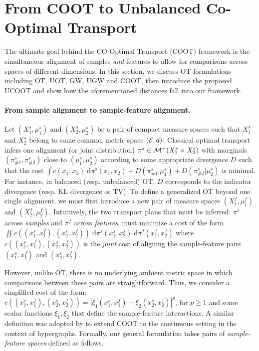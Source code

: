 \section{From COOT to Unbalanced Co-Optimal Transport} \label{sec:ucoot}
The ultimate goal behind the CO-Optimal Transport (COOT)
framework is the simultaneous alignment of samples \emph{and} features to allow for
comparisons across spaces of different dimensions. In this section, we discuss
OT formulations including OT, UOT, GW, UGW and COOT, then introduce the proposed UCOOT
and show how the aforementioned distances fall into our framework.


\paragraph{From sample alignment to sample-feature alignment.}
Let $(X_1^s, \mu_1^s)$ and $(X_2^s, \mu_2^s)$ be a pair of compact measure spaces such that
$X_1^s$ and $X_2^s$ belong to some common metric space $(\mathcal E, d)$.
Classical optimal transport infers one alignment (or joint distribution)
$\pi^s \in \mathcal M^+(X_1^{s} \times X_2^s)$ with marginals $(\pi^{s}_{\#1}, \pi^{s}_{\#2})$
close to $(\mu_1^s, \mu_2^s)$ according to some appropriate divergence $D$ such that
the cost $\int c(x_1, x_2) \; \mathrm d\pi^{s}(x_1, x_2) + D(\pi^{s}_{\#1} | \mu_1^s)
+ D(\pi^{s}_{\#2} | \mu_2^s)$ is minimal. For instance, in balanced (resp. unbalanced) OT,
$D$ corresponds to the indicator divergence (resp. KL divergence or TV).
To define a generalized OT beyond one single alignment, we must first introduce
a new pair of measure spaces $(X_1^{f}, \mu_1^f)$ and $(X_2^{f}, \mu_2^f)$.
Intuitively, the two transport plans that must be inferred: $\pi^s$ across \emph{samples}
and $\pi^f$ across \emph{features}, must minimize a cost of the form
$\iint c((x_1^s, x_1^f), (x_2^s, x_2^f)) \; \mathrm d\pi^s(x_1^s, x_2^s)\; \mathrm d \pi^f(x_1^f, x_2^f)$
where $c((x_1^s, x_1^f), (x_2^s, x_2^f))$ is the \emph{joint} cost of aligning
the sample-feature pairs $(x_1^s, x_1^f)$ and $(x_2^s, x_2^f)$.

However, unlike OT,
there is no underlying ambient metric space in which comparisons between these pairs
are straightforward. Thus, we consider a simplified cost of the form:
$c((x_1^s, x_1^f), (x_2^s, x_2^f)) = |\xi_1(x_1^s, x_1^f) - \xi_2(x_2^s, x_2^f)|^p$, for $p \geq 1$
and some scalar functions $\xi_1, \xi_2$ that define the sample-feature interactions.
A similar definition was adopted by \citet{Chowdhury21b} to extend COOT to the continuous setting
in the context of hypergraphs. Formally, our general formulation takes
pairs of \emph{sample-feature spaces} defined as follows.

